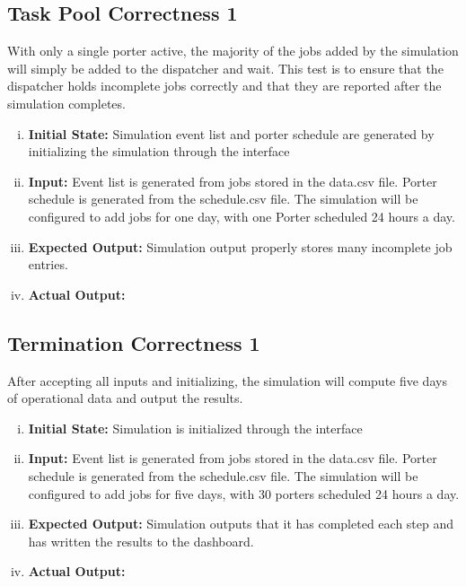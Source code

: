 \documentclass[paper=letter, fontsize=10pt]{scrartcl}
\numberwithin{equation}{section}		%
\numberwithin{figure}{section}			%
\numberwithin{table}{section}				%
\begin{document}
\subsection{Task Pool Correctness 1}
With only a single porter active, the majority of the jobs added by the simulation will simply be added to the dispatcher and wait. This test is to ensure that the dispatcher holds incomplete jobs correctly and that they are reported after the simulation completes.
\begin{enumerate}[(i)]
	\item \textbf{Initial State:} Simulation event list and porter schedule are generated by initializing the simulation through the interface
	\item \textbf{Input:} Event list is generated from jobs stored in the data.csv file. Porter schedule is generated from the schedule.csv file. The simulation will be configured to add jobs for one day, with one Porter scheduled 24 hours a day.
	\item \textbf{Expected Output:} Simulation output properly stores many incomplete job entries.
	\item \textbf{Actual Output:}
\end{enumerate}

\subsection{Termination Correctness 1}
After accepting all inputs and initializing, the simulation will compute five days of operational data and output the results.
\begin{enumerate}[(i)]
	\item \textbf{Initial State:} Simulation is initialized through the interface
	\item \textbf{Input:} Event list is generated from jobs stored in the data.csv file. Porter schedule is generated from the schedule.csv file. The simulation will be configured to add jobs for five days, with 30 porters scheduled 24 hours a day.
	\item \textbf{Expected Output:} Simulation outputs that it has completed each step and has written the results to the dashboard.
	\item \textbf{Actual Output:}
\end{enumerate}
\end{document}
